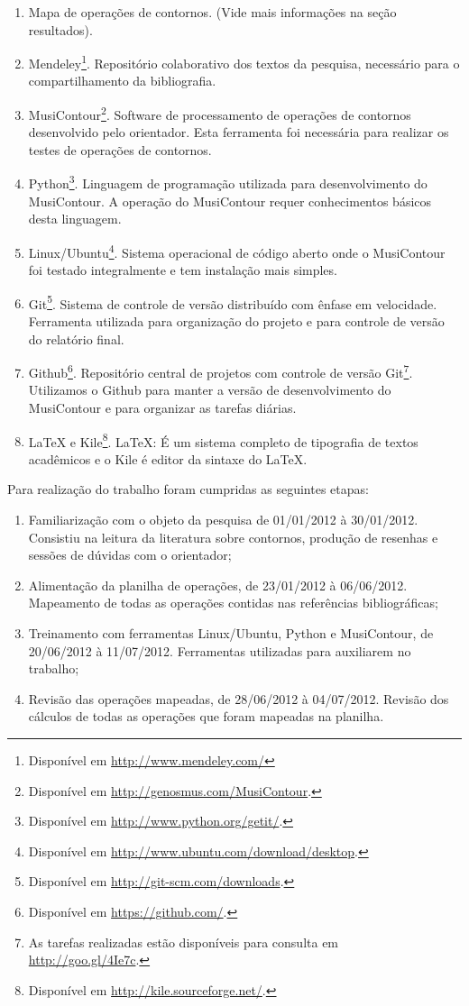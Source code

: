 \documentclass[11pt]{article}
\begin{document}
\begin{enumerate}
\item Mapa de operações de contornos. (Vide mais informações na seção
  resultados).
\item Mendeley\footnote{Disponível em
    \url{http://www.mendeley.com/}}. Repositório colaborativo dos
  textos da pesquisa, necessário para o compartilhamento da bibliografia.
\item MusiContour\footnote{Disponível em
    \url{http://genosmus.com/MusiContour}.}. Software de processamento
  de operações de contornos desenvolvido pelo orientador. Esta
  ferramenta foi necessária para realizar os testes de operações de
  contornos.
\item Python\footnote{Disponível em
    \url{http://www.python.org/getit/}.}. Linguagem de programação
  utilizada para desenvolvimento do MusiContour. A operação do
  MusiContour requer conhecimentos básicos desta linguagem.
\item Linux/Ubuntu\footnote{Disponível em
    \url{http://www.ubuntu.com/download/desktop}.}. Sistema
  operacional de código aberto onde o MusiContour foi testado
  integralmente e tem instalação mais simples.
\item Git\footnote{Disponível em
    \url{http://git-scm.com/downloads}.}. Sistema de controle de
  versão distribuído com ênfase em velocidade. Ferramenta utilizada
  para organização do projeto e para controle de versão do relatório
  final.
\item Github\footnote{Disponível em
    \url{https://github.com/}.}. Repositório central de projetos com
  controle de versão Git\footnote{As tarefas realizadas estão
    disponíveis para consulta em \url{http://goo.gl/4Ie7c}.}.
  Utilizamos o Github para manter a versão de desenvolvimento do
  MusiContour e para organizar as tarefas diárias.
\item \LaTeX{} e Kile\footnote{Disponível em
    \url{http://kile.sourceforge.net/}.}. \LaTeX: É um sistema
  completo de tipografia de textos acadêmicos e o Kile é editor da
  sintaxe do \LaTeX.
\end{enumerate}

Para realização do trabalho foram cumpridas as seguintes etapas:

\begin{enumerate}
\item Familiarização com o objeto da pesquisa de 01/01/2012 à
  30/01/2012.  Consistiu na leitura da literatura sobre contornos,
  produção de resenhas e sessões de dúvidas com o orientador;
\item Alimentação da planilha de operações, de 23/01/2012 à
  06/06/2012.  Mapeamento de todas as operações contidas nas
  referências bibliográficas;
\item Treinamento com ferramentas Linux/Ubuntu, Python e MusiContour,
  de 20/06/2012 à 11/07/2012.  Ferramentas utilizadas para auxiliarem
  no trabalho;
\item Revisão das operações mapeadas, de 28/06/2012 à 04/07/2012.
  Revisão dos cálculos de todas as operações que foram mapeadas na
  planilha.
\end{enumerate}
\end{document}
